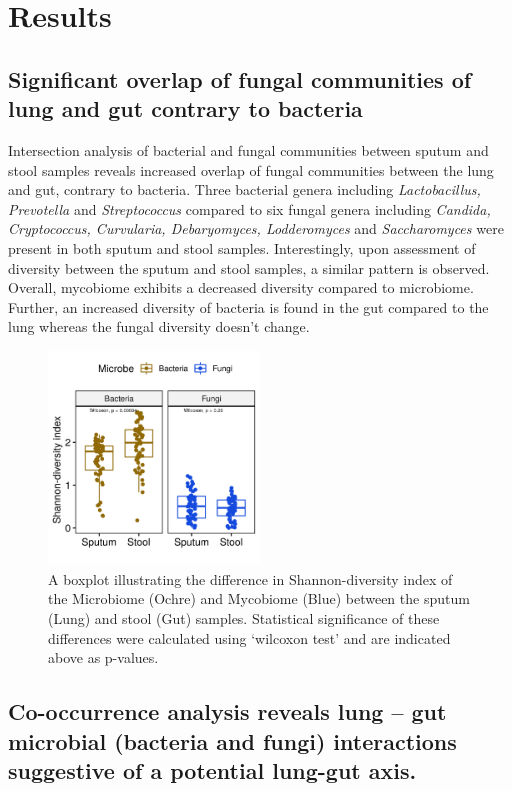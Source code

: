 \section{Results}

\subsection{Significant overlap of fungal communities of lung and gut contrary to bacteria}

Intersection analysis of bacterial and fungal communities between sputum and stool samples reveals increased overlap of fungal communities between the lung and gut, contrary to bacteria. Three bacterial genera including \emph{Lactobacillus, Prevotella} and \emph{Streptococcus} compared to six fungal genera including \emph{Candida, Cryptococcus, Curvularia, Debaryomyces, Lodderomyces} and \emph{Saccharomyces} were present in both sputum and stool samples. Interestingly, upon assessment of diversity between the sputum and stool samples, a similar pattern is observed. Overall, mycobiome exhibits a decreased diversity compared to microbiome. Further, an increased diversity of bacteria is found in the gut compared to the lung whereas the fungal diversity doesn't change. 

\begin{figure}[h]
	\centering
	\includegraphics[width=0.5\textwidth]{image/diversity.png}
	\caption{A boxplot illustrating the difference in Shannon-diversity index of the Microbiome (Ochre) and Mycobiome (Blue) between the sputum (Lung) and stool (Gut) samples. Statistical significance of these differences were calculated using `wilcoxon test' and are indicated above as p-values.}
	\label{res2_fig1}
\end{figure}

\subsection{Co-occurrence analysis reveals lung – gut microbial (bacteria and fungi) interactions suggestive of a potential lung-gut axis.}


